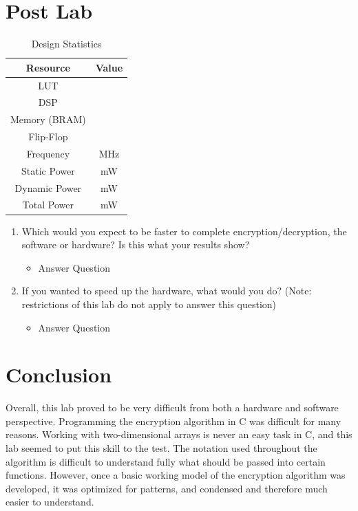 \documentclass[journal, twocolumn, final,11pt,letterpaper]{IEEEtran}
\begin{document}
\section{Post Lab}
\begin{table}[htbp]
	\centering
	\begin{tabular}{c|c}	%
		\toprule	%
		Resource & Value \\
		\midrule
		LUT & \\
		DSP & \\
		Memory (BRAM) & \\
		Flip-Flop & \\
		Frequency &  MHz\\
		Static Power &  mW\\
		Dynamic Power & mW\\
		Total Power & mW\\
		\bottomrule	%
	\end{tabular}%
	\caption{Design Statistics}
	\label{tab:design}
\end{table}

\begin{enumerate}
	\item Which would you expect to be faster to complete encryption/decryption, the software or hardware? Is this what your results show?
	\begin{itemize}
		\item Answer Question
	\end{itemize}
	\item If you wanted to speed up the hardware, what would you do? (Note: restrictions of this lab do not apply to answer this question)
	\begin{itemize}
		\item Answer Question
	\end{itemize}
\end{enumerate}


\section{Conclusion}
Overall, this lab proved to be very difficult from both a hardware and software perspective. Programming the encryption algorithm in C was difficult for many reasons. Working with two-dimensional arrays is never an easy task in C, and this lab seemed to put this skill to the test. The notation used throughout the algorithm is difficult to understand fully what should be passed into certain functions. However, once a basic working model of the encryption algorithm was developed, it was optimized for patterns, and condensed and therefore much easier to understand. \\
\end{document}
